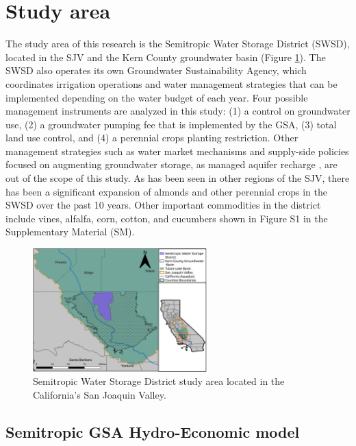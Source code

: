 \documentclass[a4paper,fleqn]{cas-sc}
\begin{document}
\section{Study area}

The study area of this research is the Semitropic Water Storage District (SWSD), located in the SJV and the Kern County groundwater basin (Figure \ref{fig:2}). The SWSD also operates its own Groundwater Sustainability Agency, which  coordinates irrigation operations and water management strategies that can be implemented depending on the water budget of each year. Four possible management instruments are analyzed in this study: (1) a control on groundwater use, (2) a groundwater pumping fee that is implemented by the GSA, (3) total land use control, and (4) a perennial crops planting restriction. Other management strategies such as water market mechanisms and supply-side policies focused on augmenting groundwater storage, as managed aquifer recharge \citep{ulibarri_assessing_2021}, are out of the scope of this study. As has been seen in other regions of the SJV, there has been a significant expansion of almonds and other perennial crops in the SWSD over the past 10 years. Other important commodities in the district include vines, alfalfa, corn, cotton, and cucumbers shown in Figure S1 in the Supplementary Material (SM). 
  

\begin{figure}[ht]
    \centering
    \includegraphics[width=0.6\textwidth,center]{Map_Semitropic.jpg}
    \caption{Semitropic Water Storage District study area located in the California’s San Joaquin Valley.}
    \label{fig:2}
\end{figure}

\subsection{Semitropic GSA Hydro-Economic model}
\end{document}
